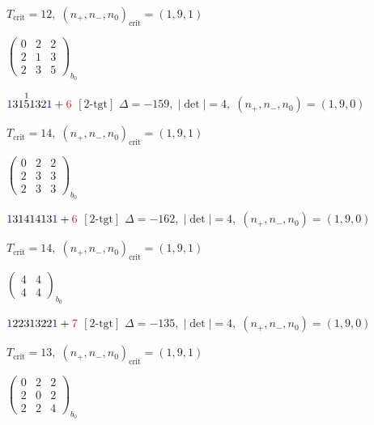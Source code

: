 \documentclass[10pt]{article}
\begin{document}
\hspace{1em}$T_{\text{crit}}=12,\; (n_+,n_-,n_0)_{\text{crit}}=(1,9,1)$

\hspace{2em}$\left(\begin{smallmatrix}0 & 2 & 2 \\ 2 & 1 & 3 \\ 2 & 3 & 5\end{smallmatrix}\right)_{\!b_0}$

\smallskip

$\textcolor{blue}{1}31\overset{1}{5}132\textcolor{blue}{1}+\textcolor{red}{6}$ $\scriptstyle [2\text{-tgt}]$ \quad $\Delta=-159,\; |\det|=4,\; (n_+,n_-,n_0)=(1,9,0)$

\hspace{1em}$T_{\text{crit}}=14,\; (n_+,n_-,n_0)_{\text{crit}}=(1,9,1)$

\hspace{2em}$\left(\begin{smallmatrix}0 & 2 & 2 \\ 2 & 3 & 3 \\ 2 & 3 & 3\end{smallmatrix}\right)_{\!b_0}$

\smallskip

$\textcolor{blue}{1}3141413\textcolor{blue}{1}+\textcolor{red}{6}$ $\scriptstyle [2\text{-tgt}]$ \quad $\Delta=-162,\; |\det|=4,\; (n_+,n_-,n_0)=(1,9,0)$

\hspace{1em}$T_{\text{crit}}=14,\; (n_+,n_-,n_0)_{\text{crit}}=(1,9,1)$

\hspace{2em}$\left(\begin{smallmatrix}4 & 4 \\ 4 & 4\end{smallmatrix}\right)_{\!b_0}$

\smallskip

$\textcolor{blue}{1}2231322\textcolor{blue}{1}+\textcolor{red}{7}$ $\scriptstyle [2\text{-tgt}]$ \quad $\Delta=-135,\; |\det|=4,\; (n_+,n_-,n_0)=(1,9,0)$

\hspace{1em}$T_{\text{crit}}=13,\; (n_+,n_-,n_0)_{\text{crit}}=(1,9,1)$

\hspace{2em}$\left(\begin{smallmatrix}0 & 2 & 2 \\ 2 & 0 & 2 \\ 2 & 2 & 4\end{smallmatrix}\right)_{\!b_0}$
\end{document}
